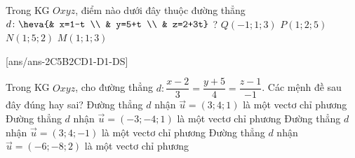 \begin{ex}%
	Trong KG $Oxyz$, điểm nào dưới đây thuộc đường thẳng $d \colon \heva{& x=1-t \\ & y=5+t \\ 	& z=2+3t}$ ?
	\choice
	{  $Q\left( -1; 1; 3 \right)$}
	{ $P\left( 1; 2; 5 \right)$}
	{\True $N\left( 1; 5;2 \right)$}
	{ $M\left( 1; 1; 3 \right)$}
\end{ex}
\TNTF
{}[ans/ans-2C5B2CD1-D1-DS]
\begin{ex}%
	Trong KG $Oxyz$, cho đường thẳng $d \colon \dfrac{x-2}{3}=\dfrac{y+5}{4}=\dfrac{z-1}{-1}$.  Các mệnh đề sau đây đúng hay sai?
	\choiceTF
	{ Đường thẳng $d$ nhận $\overrightarrow{u}=\left( 3;4;1 \right)$ là một vectơ chỉ phương}
	{ \True Đường thẳng $d$ nhận $\overrightarrow{u}=\left( -3;-4;1 \right)$ là một vectơ chỉ phương}
	{\True  Đường thẳng $d$ nhận $\overrightarrow{u}=\left( 3;4;-1 \right)$ là một vectơ chỉ phương}
	{ \True Đường thẳng $d$ nhận $\overrightarrow{u}=\left( -6;-8;2 \right)$ là một vectơ chỉ phương}
\end{ex}
